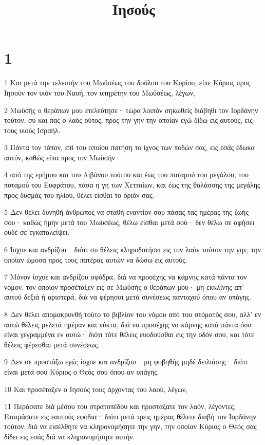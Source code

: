 

\title{Ιησούς}


\chapter{1}

\par 1 Και μετά την τελευτήν του Μωϋσέως του δούλου του Κυρίου, είπε Κύριος προς Ιησούν τον υιόν του Ναυή, τον υπηρέτην του Μωϋσέως, λέγων,
\par 2 Μωϋσής ο θεράπων μου ετελεύτησε· τώρα λοιπόν σηκωθείς διάβηθι τον Ιορδάνην τούτον, συ και πας ο λαός ούτος, προς την γην την οποίαν εγώ δίδω εις αυτούς, εις τους υιούς Ισραήλ.
\par 3 Πάντα τον τόπον, επί του οποίου πατήση το ίχνος των ποδών σας, εις εσάς έδωκα αυτόν, καθώς είπα προς τον Μωϋσήν·
\par 4 από της ερήμου και του Λιβάνου τούτου και έως του ποταμού του μεγάλου, του ποταμού του Ευφράτου, πάσα η γη των Χετταίων, και έως της θαλάσσης της μεγάλης προς δυσμάς του ηλίου, θέλει είσθαι το όριόν σας.
\par 5 Δεν θέλει δυνηθή άνθρωπος να σταθή εναντίον σου πάσας τας ημέρας της ζωής σου· καθώς ήμην μετά του Μωϋσέως, θέλω είσθαι μετά σού· δεν θέλω σε αφήσει ουδέ σε εγκαταλείψει.
\par 6 Ίσχυε και ανδρίζου· διότι συ θέλεις κληροδοτήσει εις τον λαόν τούτον την γην, την οποίαν ώμοσα προς τους πατέρας αυτών να δώσω εις αυτούς.
\par 7 Μόνον ίσχυε και ανδρίζου σφόδρα, διά να προσέχης να κάμνης κατά πάντα τον νόμον, τον οποίον προσέταξεν εις σε Μωϋσής ο θεράπων μου· μη εκκλίνης απ' αυτού δεξιά ή αριστερά, διά να φέρησαι μετά συνέσεως πανταχού όπου αν υπάγης.
\par 8 Δεν θέλει απομακρυνθή τούτο το βιβλίον του νόμου από του στόματός σου, αλλ' εν αυτώ θέλεις μελετά ημέραν και νύκτα, διά να προσέχης να κάμνης κατά πάντα όσα είναι γεγραμμένα εν αυτώ· διότι τότε θέλεις ευοδούσθαι εις την οδόν σου, και τότε θέλεις φέρεσθαι μετά συνέσεως.
\par 9 Δεν σε προστάζω εγώ; ίσχυε και ανδρίζου· μη φοβηθής μηδέ δειλιάσης· διότι είναι μετά σου Κύριος ο Θεός σου όπου αν υπάγης.
\par 10 Και προσέταξεν ο Ιησούς τους άρχοντας του λαού, λέγων,
\par 11 Περάσατε διά μέσου του στρατοπέδου και προστάξατε τον λαόν, λέγοντες, Ετοιμάσατε εις εαυτούς εφόδια· διότι μετά τρεις ημέρας θέλετε διαβή τον Ιορδάνην τούτον, διά να εισέλθητε να κληρονομήσητε την γην, την οποίαν Κύριος ο Θεός σας δίδει εις εσάς διά να κληρονομήσητε αυτήν.
